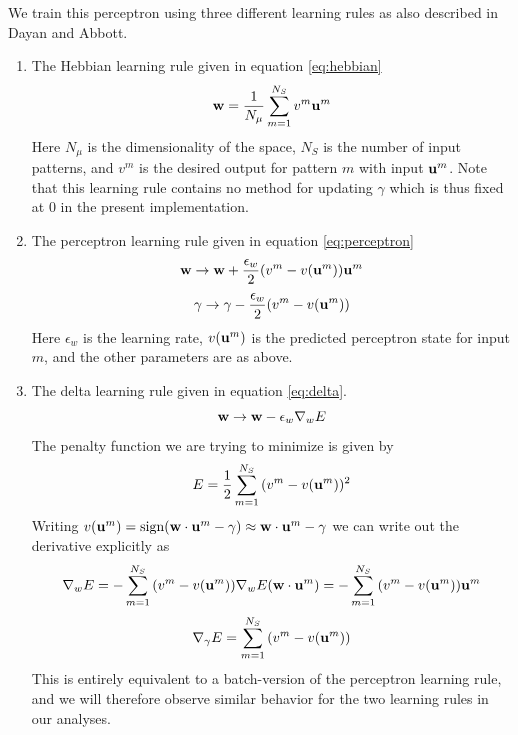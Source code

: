 \documentclass{article}
\begin{document}
We train this perceptron using three different learning rules as also described in Dayan and Abbott.
\begin{enumerate}
\item
The Hebbian learning rule given in equation \ref{eq:hebbian}
\begin{equation}\label{eq:hebbian}
{\bf w} = \dfrac{1}{N_\mu} \sum_{m = 1}^{N_S}{v^m {\bf u}^m}
\end{equation}
Here $N_\mu$ is the dimensionality of the space, $N_S$ is the number of input patterns, and $v^m$ is the desired output for pattern $m$ with input ${\bf u}^m$. Note that this learning rule contains no method for updating $\gamma$ which is thus fixed at 0 in the present implementation.

\item
The perceptron learning rule given in equation \ref{eq:perceptron}
\begin{equation}\label{eq:perceptron}
{\bf w} \rightarrow {\bf w} + \dfrac{\epsilon_w}{2}(v^m - v({\bf u}^m)) {\bf u}^m
\end{equation}
\begin{equation}
\gamma \rightarrow \gamma - \dfrac{\epsilon_w}{2}(v^m - v({\bf u}^m))
\end{equation}
Here $\epsilon_w$ is the learning rate,  $v({\bf u}^m)$ is the predicted perceptron state for input $m$, and the other parameters are as above.

\item
The delta learning rule given in equation \ref{eq:delta}.
\begin{equation}\label{eq:delta}
{\bf w} \rightarrow {\bf w} - \epsilon_w \nabla_w E
\end{equation}
The penalty function we are trying to minimize is given by
\begin{equation}
E = \dfrac{1}{2} \sum_{m=1}^{N_S}{(v^m-v({\bf u}^m))^2}
\end{equation}
Writing $v({\bf u}^m) = \text{sign}( {\bf w} \cdot {\bf u}^m - \gamma) \approx {\bf w} \cdot {\bf u}^m - \gamma $ we can write out the derivative explicitly as
\begin{equation}
 \nabla_w E =- \sum_{m=1}^{N_S}{(v^m-v({\bf u}^m)) \nabla_w E({\bf w} \cdot {\bf u}^m)} = - \sum_{m=1}^{N_S}{(v^m-v({\bf u}^m)) {\bf u}^m}
\end{equation}
\begin{equation}
 \nabla_\gamma E = \sum_{m=1}^{N_S}{(v^m-v({\bf u}^m))}
\end{equation}
This is entirely equivalent to a batch-version of the perceptron learning rule, and we will therefore observe similar behavior for the two learning rules in our analyses.
\end{enumerate}
\end{document}
